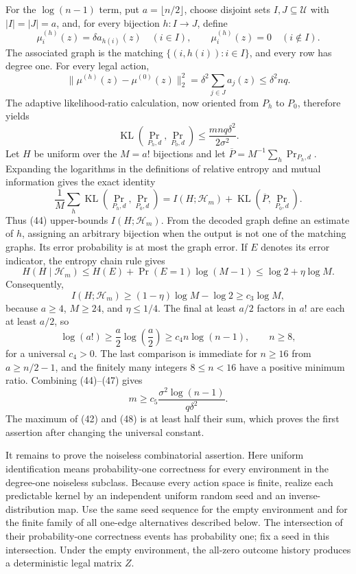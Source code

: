 For the \(\log(n-1)\) term, put \(a=\lfloor n/2\rfloor\), choose disjoint sets \(I,J\subseteq\mathcal U\) with \(|I|=|J|=a\), and, for every bijection \(h:I\to J\), define
\[
 \mu_i^{(h)}(z)=\delta a_{h(i)}(z)\quad(i\in I),
 \qquad
 \mu_i^{(h)}(z)=0\quad(i\notin I).
 \tag{43}
\]
The associated graph is the matching \(\{(i,h(i)):i\in I\}\), and every row has degree one.  For every legal action,
\[
 \lVert\mu^{(h)}(z)-\mu^{(0)}(z)\rVert_2^2
 =\delta^2\sum_{j\in J}a_j(z)
 \le\delta^2nq.
\]
The adaptive likelihood-ratio calculation, now oriented from \(P_h\) to \(P_0\), therefore yields
\[
 \operatorname{KL}(\Pr_{P_h,d},\Pr_{P_0,d})
 \le\frac{mnq\delta^2}{2\sigma^2}.
 \tag{44}
\]
Let \(H\) be uniform over the \(M=a!\) bijections and let \(\overline P=M^{-1}\sum_h\Pr_{P_h,d}\).  Expanding the logarithms in the definitions of relative entropy and mutual information gives the exact identity
\[
 \frac1M\sum_h\operatorname{KL}(\Pr_{P_h,d},\Pr_{P_0,d})
 =I(H;\mathscr H_m)+\operatorname{KL}(\overline P,\Pr_{P_0,d}).
 \tag{45}
\]
Thus (44) upper-bounds \(I(H;\mathscr H_m)\).  From the decoded graph define an estimate of \(h\), assigning an arbitrary bijection when the output is not one of the matching graphs.  Its error probability is at most the graph error.  If \(E\) denotes its error indicator, the entropy chain rule gives
\[
 H(H\mid\mathscr H_m)
 \le H(E)+\Pr(E=1)\log(M-1)
 \le\log2+\eta\log M.
\]
Consequently,
\[
 I(H;\mathscr H_m)\ge(1-\eta)\log M-\log2\ge c_3\log M,
 \tag{46}
\]
because \(a\ge4\), \(M\ge24\), and \(\eta\le1/4\).  The final at least \(a/2\) factors in \(a!\) are each at least \(a/2\), so
\[
 \log(a!)\ge\frac a2\log\!\left(\frac a2\right)
 \ge c_4n\log(n-1),
 \qquad n\ge8,
 \tag{47}
\]
for a universal \(c_4>0\).  The last comparison is immediate for \(n\ge16\) from \(a\ge n/2-1\), and the finitely many integers \(8\le n<16\) have a positive minimum ratio.  Combining (44)--(47) gives
\[
 m\ge c_5\frac{\sigma^2\log(n-1)}{q\delta^2}.
 \tag{48}
\]
The maximum of (42) and (48) is at least half their sum, which proves the first assertion after changing the universal constant.

It remains to prove the noiseless combinatorial assertion.  Here uniform identification means probability-one correctness for every environment in the degree-one noiseless subclass.  Because every action space is finite, realize each predictable kernel by an independent uniform random seed and an inverse-distribution map.  Use the same seed sequence for the empty environment and for the finite family of all one-edge alternatives described below.  The intersection of their probability-one correctness events has probability one; fix a seed in this intersection.  Under the empty environment, the all-zero outcome history produces a deterministic legal matrix \(Z\).

